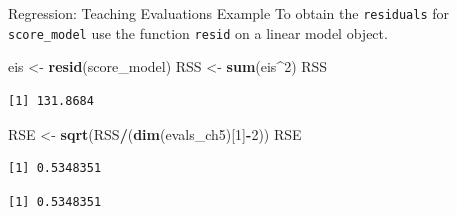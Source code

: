 \documentclass[
  ignorenonframetext,
]{beamer}
\newenvironment{Shaded}{\begin{snugshade}}{\end{snugshade}}
\newcommand{\CommentTok}[1]{\textcolor[rgb]{0.56,0.35,0.01}{\textit{#1}}}
\newcommand{\DecValTok}[1]{\textcolor[rgb]{0.00,0.00,0.81}{#1}}
\newcommand{\FunctionTok}[1]{\textcolor[rgb]{0.13,0.29,0.53}{\textbf{#1}}}
\newcommand{\NormalTok}[1]{#1}
\newcommand{\OtherTok}[1]{\textcolor[rgb]{0.56,0.35,0.01}{#1}}
\newcommand{\SpecialCharTok}[1]{\textcolor[rgb]{0.81,0.36,0.00}{\textbf{#1}}}
\begin{document}
\begin{frame}[fragile]{Regression: Teaching Evaluations Example}
\protect\hypertarget{regression-teaching-evaluations-example-8}{}
To obtain the \texttt{residuals} for \texttt{score\_model} use the
function \texttt{resid} on a linear model object. \tiny

\begin{Shaded}
\begin{Highlighting}[]
\NormalTok{eis }\OtherTok{\textless{}{-}} \FunctionTok{resid}\NormalTok{(score\_model)}
\NormalTok{RSS }\OtherTok{\textless{}{-}} \FunctionTok{sum}\NormalTok{(eis}\SpecialCharTok{\^{}}\DecValTok{2}\NormalTok{)}
\NormalTok{RSS}
\end{Highlighting}
\end{Shaded}

\begin{verbatim}
[1] 131.8684
\end{verbatim}

\begin{Shaded}
\begin{Highlighting}[]
\NormalTok{RSE }\OtherTok{\textless{}{-}} \FunctionTok{sqrt}\NormalTok{(RSS}\SpecialCharTok{/}\NormalTok{(}\FunctionTok{dim}\NormalTok{(evals\_ch5)[}\DecValTok{1}\NormalTok{]}\SpecialCharTok{{-}}\DecValTok{2}\NormalTok{))}
\NormalTok{RSE}
\end{Highlighting}
\end{Shaded}

\begin{verbatim}
[1] 0.5348351
\end{verbatim}

\begin{Shaded}
\end{Shaded}

\begin{verbatim}
[1] 0.5348351
\end{verbatim}

\normalsize
\end{frame}
\end{document}
